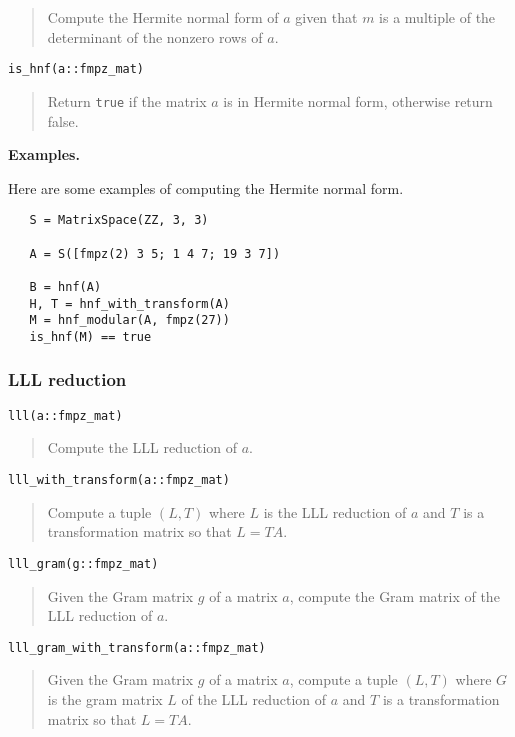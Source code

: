 \documentclass[a4paper,10pt]{article}
\newcommand{\code}{\lstinline}
\newcommand{\desc}[1]{\vspace{-3mm}\begin{quote}#1\end{quote}}
\begin{document}
{{\desc{Compute the Hermite normal form of $a$ given that $m$ is a multiple of
the determinant of the nonzero rows of $a$.}

\begin{lstlisting}
is_hnf(a::fmpz_mat)
\end{lstlisting}

\desc{Return \code{true} if the matrix $a$ is in Hermite normal form, otherwise
return false.}

\textbf{Examples.}

Here are some examples of computing the Hermite normal form.

\begin{lstlisting}
   S = MatrixSpace(ZZ, 3, 3)

   A = S([fmpz(2) 3 5; 1 4 7; 19 3 7])
   
   B = hnf(A)
   H, T = hnf_with_transform(A)
   M = hnf_modular(A, fmpz(27))
   is_hnf(M) == true
\end{lstlisting}

\subsubsection{LLL reduction}

\begin{lstlisting}
lll(a::fmpz_mat)
\end{lstlisting}

\desc{Compute the LLL reduction of $a$.}

\begin{lstlisting}
lll_with_transform(a::fmpz_mat)
\end{lstlisting}

\desc{Compute a tuple $(L, T)$ where $L$ is the LLL reduction of $a$
and $T$ is a transformation matrix so that $L = TA$.}

\begin{lstlisting}
lll_gram(g::fmpz_mat)
\end{lstlisting}

\desc{Given the Gram matrix $g$ of a matrix $a$, compute the Gram matrix of
the LLL reduction of $a$.}

\begin{lstlisting}
lll_gram_with_transform(a::fmpz_mat)
\end{lstlisting}

\desc{Given the Gram matrix $g$ of a matrix $a$, compute a tuple $(L, T)$ where
$G$ is the gram matrix $L$ of the LLL reduction of $a$ and $T$ is a transformation
matrix so that $L = TA$.}

}}
\end{document}

